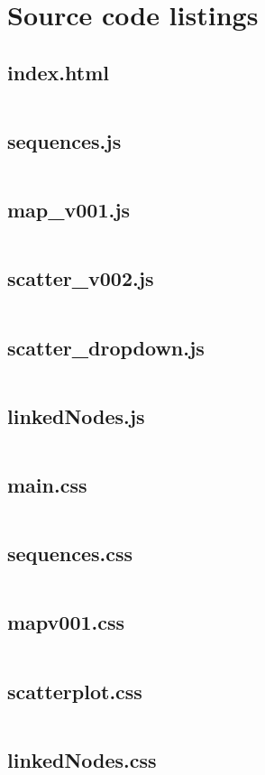 \documentclass[a4paper, 11pt]{article}
\begin{document}


\newpage
\section*{Source code listings}
\subsection{index.html}
\inputminted[linenos]{html}{source/index.html}

\newpage
\subsection{sequences.js}
\inputminted[linenos]{js}{source/sequences.js}

\newpage
\subsection{map\_v001.js}
\inputminted[linenos]{js}{source/map_v001.js}

\newpage
\subsection{scatter\_v002.js}
\inputminted[linenos]{js}{source/scatter_v002.js}

\newpage
\subsection{scatter\_dropdown.js}
\inputminted[linenos]{js}{source/scatter_dropdown.js}

\newpage
\subsection{linkedNodes.js}
\inputminted[linenos]{js}{source/linkedNodes.js}


\newpage
\subsection{main.css}
\inputminted[linenos]{css}{source/main.css}


\newpage
\subsection{sequences.css}
\inputminted[linenos]{css}{source/sequences.css}


\newpage
\subsection{map\-v001.css}
\inputminted[linenos]{css}{source/map-v001.css}


\newpage
\subsection{scatterplot.css}
\inputminted[linenos]{css}{source/scatterplot.css}

\newpage
\subsection{linkedNodes.css}
\inputminted[linenos]{css}{source/linkedNodes.css}
\end{document}
